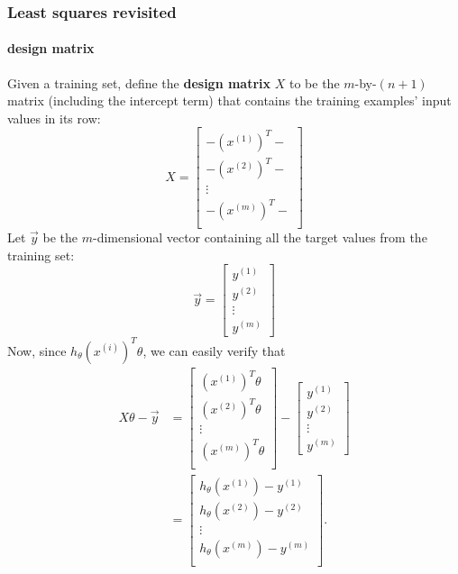 \documentclass{article}
\begin{document}
\subsubsection{Least squares revisited}
\paragraph{design matrix} Given a training set, define the \textbf{design matrix} $X$ to be the $m$-by-$(n+1)$ matrix (including the intercept term) that contains the training examples' input values in its row:
\begin{equation}
	\label{eq:design_matrix}
	X =
	\begin{bmatrix}
		- \left(x^{(1)}\right)^T -\\
		- \left(x^{(2)}\right)^T -\\
		\vdots \\
		- \left(x^{(m)}\right)^T -\\
	\end{bmatrix}
\end{equation}
Let $\vec{y}$ be the $m$-dimensional vector containing all the target values from the training set:
\begin{equation}
	\label{eq:target_values}
	\vec{y} =
	\begin{bmatrix}
		y^{(1)} \\
		y^{(2)} \\
		\vdots \\
		y^{(m)}
	\end{bmatrix}
\end{equation}
Now, since $h_\theta\left(x^{(i)}\right)^T\theta$, we can easily verify that
\begin{align*}
	X\theta - \vec{y} &=
	\begin{bmatrix}
		\left(x^{(1)}\right)^T\theta \\
		\left(x^{(2)}\right)^T\theta \\
		\vdots \\
		\left(x^{(m)}\right)^T\theta \\
	\end{bmatrix}
	-
	\begin{bmatrix}
		y^{(1)} \\
		y^{(2)} \\
		\vdots \\
		y^{(m)}
	\end{bmatrix} \\
	&=
	\begin{bmatrix}
		h_\theta\left(x^{(1)}\right) - y^{(1)} \\
		h_\theta\left(x^{(2)}\right) - y^{(2)} \\
		\vdots \\
		h_\theta\left(x^{(m)}\right) - y^{(m)} \\
	\end{bmatrix}.
\end{align*}
\end{document}
